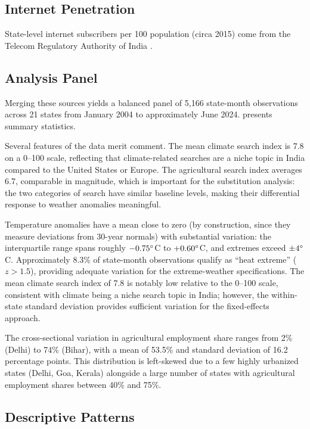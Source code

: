 \documentclass[12pt]{article}
\begin{document}
\subsection{Internet Penetration}

State-level internet subscribers per 100 population (circa 2015) come from the Telecom Regulatory Authority of India \citep{trai2023}.

\subsection{Analysis Panel}

Merging these sources yields a balanced panel of 5,166 state-month observations across 21 states from January 2004 to approximately June 2024.  presents summary statistics.



Several features of the data merit comment. The mean climate search index is 7.8 on a 0--100 scale, reflecting that climate-related searches are a niche topic in India compared to the United States or Europe. The agricultural search index averages 6.7, comparable in magnitude, which is important for the substitution analysis: the two categories of search have similar baseline levels, making their differential response to weather anomalies meaningful.

Temperature anomalies have a mean close to zero (by construction, since they measure deviations from 30-year normals) with substantial variation: the interquartile range spans roughly $-0.75\degree$C to $+0.60\degree$C, and extremes exceed $\pm 4\degree$C. Approximately 8.3\% of state-month observations qualify as ``heat extreme'' ($z > 1.5$), providing adequate variation for the extreme-weather specifications. The mean climate search index of 7.8 is notably low relative to the 0--100 scale, consistent with climate being a niche search topic in India; however, the within-state standard deviation provides sufficient variation for the fixed-effects approach.

The cross-sectional variation in agricultural employment share ranges from 2\% (Delhi) to 74\% (Bihar), with a mean of 53.5\% and standard deviation of 16.2 percentage points. This distribution is left-skewed due to a few highly urbanized states (Delhi, Goa, Kerala) alongside a large number of states with agricultural employment shares between 40\% and 75\%.

\subsection{Descriptive Patterns}
\end{document}
